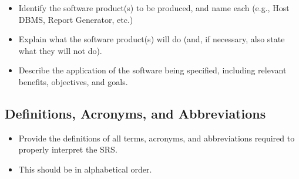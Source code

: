 \documentclass[]{article}
\begin{document}
\begin{itemize}
	\item Identify the software product(s) to be produced, and name each (e.g., Host DBMS, Report Generator, etc.)
	\newline
	\item Explain what the software product(s) will do (and, if necessary, also state what they will not do).
	\item Describe the application of the software being specified, including relevant benefits, objectives, and goals.
\end{itemize}

\subsection{Definitions, Acronyms, and Abbreviations}
\label{sub:definitions_acronyms_and_abbreviations}
\begin{itemize}
	\item Provide the definitions of all terms, acronyms, and abbreviations required to properly interpret the SRS.
	\item This should be in alphabetical order.
\end{itemize}
\end{document}
